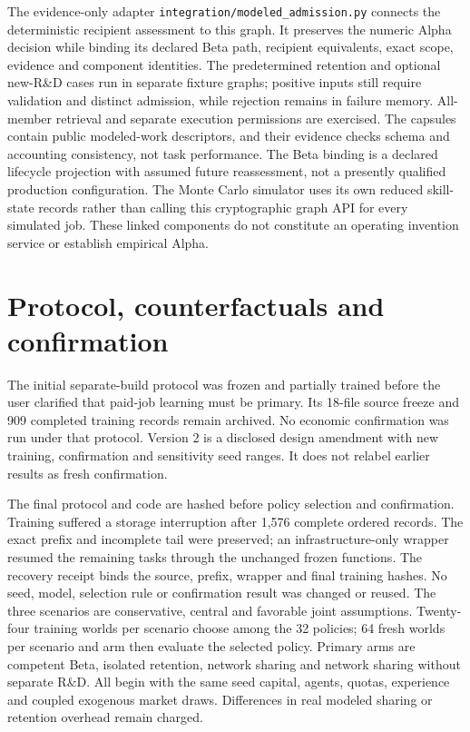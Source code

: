 \documentclass[11pt,letterpaper]{article}
\begin{document}
The evidence-only adapter \texttt{integration/modeled\_admission.py} connects the
deterministic recipient assessment to this graph. It preserves the numeric Alpha
decision while binding its declared Beta path, recipient equivalents, exact
scope, evidence and component identities. The predetermined retention and
optional new-R\&D cases run in separate fixture graphs; positive inputs still
require validation and distinct admission, while rejection remains in failure
memory. All-member retrieval and separate execution permissions are exercised.
The capsules contain public modeled-work descriptors, and their evidence checks
schema and accounting consistency, not task performance. The Beta binding is a
declared lifecycle projection with assumed future reassessment, not a presently
qualified production configuration. The Monte Carlo simulator uses its own
reduced skill-state records rather than calling this cryptographic graph API for
every simulated job. These linked components do not constitute an operating
invention service or establish empirical Alpha.

\section{Protocol, counterfactuals and confirmation}

The initial separate-build protocol was frozen and partially trained before the
user clarified that paid-job learning must be primary. Its 18-file source freeze
and 909 completed training records remain archived. No economic confirmation
was run under that protocol. Version 2 is a disclosed design amendment with new
training, confirmation and sensitivity seed ranges. It does not relabel earlier
results as fresh confirmation.

The final protocol and code are hashed before policy selection and confirmation.
Training suffered a storage interruption after 1,576 complete ordered records.
The exact prefix and incomplete tail were preserved; an infrastructure-only
wrapper resumed the remaining tasks through the unchanged frozen functions.
The recovery receipt binds the source, prefix, wrapper and final training hashes.
No seed, model, selection rule or confirmation result was changed or reused.
The three scenarios are conservative, central and favorable joint assumptions.
Twenty-four training worlds per scenario choose among the 32 policies; 64 fresh
worlds per scenario and arm then evaluate the selected policy. Primary arms are
competent Beta, isolated retention, network sharing and network sharing without
separate R\&D. All begin with the same seed capital, agents, quotas, experience
and coupled exogenous market draws. Differences in real modeled sharing or
retention overhead remain charged.
\end{document}
